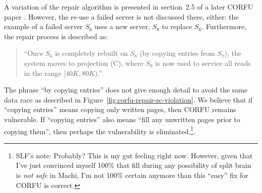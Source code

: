 \documentclass[preprint,10pt]{sigplanconf}
\begin{document}
A variation of the repair
algorithm is presented in section~2.5 of a later CORFU paper \cite{corfu2}.
However, the re-use a failed
server is not discussed there, either: the example of a failed server
$S_6$ uses a new server, $S_8$ to replace $S_6$.  Furthermore, the
repair process is described as:

\begin{quote}
``Once $S_6$ is completely rebuilt on $S_8$ (by copying entries from
  $S_7$), the system moves to projection (C), where $S_8$ is now used
  to service all reads in the range $[40K,80K)$.''
\end{quote}

The phrase ``by copying entries'' does not give enough
detail to avoid the same data race as described in
Figure~\ref{fig:corfu-repair-sc-violation}.  We believe that if
``copying entries'' means copying only written pages, then CORFU
remains vulnerable.  If ``copying entries'' also means ``fill any
unwritten pages prior to copying them'', then perhaps the
vulnerability is eliminated.\footnote{SLF's note: Probably?  This is my
  gut feeling right now.  However, given that I've just convinced
  myself 100\% that fill during any possibility of split brain is {\em
  not safe} in Machi, I'm not 100\% certain anymore than this ``easy''
  fix for CORFU is correct.}.
\end{document}
